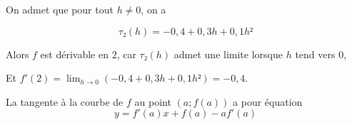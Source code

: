 \documentclass[
	classe=$1^{ere}STI2D$,
	headerTitle=Cours\space Chapitre\space 5
]{coursclass}
\begin{document}
\begin{exemple}
\begin{itemize}
		      On admet que pour tout $h ≠ 0$, on a

		      $$ τ₂(h) = -0,4 + 0,3h + 0,1h² $$

		      Alors $f$ est dérivable en $2$, car $τ₂(h)$ admet une limite lorsque $h$ tend vers $0$,

		      Et $f'(2) = \lim_{h→0}(-0,4 + 0,3h + 0,1h²) = -0,4$.
	\end{itemize}
\end{exemple}

\begin{propriete}
	La tangente à la courbe de $f$ au point $(a ; f(a))$ a pour équation
	$$ y = f'(a)x + f(a) - af'(a) $$
\end{propriete}
\end{document}
